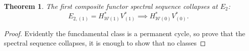 \documentclass[11pt]{amsart}
\theoremstyle{plain}
\newtheorem{thm}{Theorem}[section]
\theoremstyle{definition}
\newcommand{\calw}{\mathcal{W}}
\theoremstyle{plain}
\newcommand{\Sqh}{\mathrm{Sq}_\textup{h}}
\newcommand{\Sqv}{\mathrm{Sq}_\textup{v}}
\begin{document}
\begin{Calculations of HW0}
\begin{thm}
The first composite functor spectral sequence collapses at $E_2$:
\[E_{2,(1)}=H^*_{\calw(1)}V^*_{(1)}\implies H^*_{\calw(0)}V^*_{(0)}.\]
\end{thm}
\begin{proof}
Evidently the funcdamental class is a permanent cycle, so prove that the spectral sequence collapses, it is enough to show that no classes
%
%
%
%
%

\end{proof}
\end{Calculations of HW0}
\end{document}
